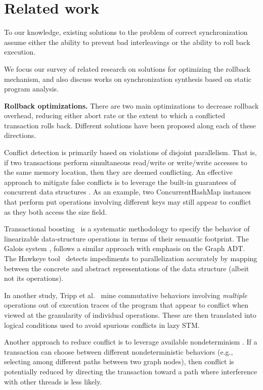 \section{Related work}
To our knowledge, existing solutions to the problem of correct synchronization assume either the ability to prevent bad interleavings or the ability to roll back execution. 

We focus our survey of related research on solutions for optimizing the rollback mechanism, and also discuss works on synchronization synthesis based on static program analysis.

\noindent \textbf{Rollback optimizations.}
There are two main optimizations to decrease rollback overhead, reducing either abort rate or the extent to which a conflicted transaction rolls back. Different solutions have been proposed along each of these directions.

Conflict detection is primarily based on violations of disjoint parallelism. That is, if two transactions perform simultaneous read/write or write/write accesses to the same memory location, then they are deemed conflicting. 
%
An effective approach to mitigate false conflicts is to leverage the built-in guarantees of concurrent data structures \cite{ppopp/HerlihyK08,Galois,TYFS:OOPSLA11}. As an example, two {\sf ConcurrentHashMap} instances that perform {\sf put} operations involving different keys may still appear to conflict as they both access the {\sf size} field.

Transactional boosting~\cite{ppopp/HerlihyK08} is a systematic methodology to specify the behavior of linearizable data-structure operations in terms of their semantic footprint. The Galois system \cite{Galois}, follows a similar approach with emphasis on the {\sf Graph} ADT. The Hawkeye tool~\cite{TYFS:OOPSLA11} detects impediments to parallelization accurately by mapping between the concrete and abstract representations of the data structure (albeit not its operations).

In another study, Tripp et al.~\cite{TMFS:PLDI12} mine commutative behaviors involving \emph{multiple} operations out of execution traces of the program that appear to conflict when viewed at the granularity of individual operations. These are then translated into logical conditions used to avoid spurious conflicts in lazy STM.

Another approach to reduce conflict is to leverage available nondeterminism \cite{TKS:OOPSLA13}. If a transaction can choose between different nondeterministic behaviors (e.g., selecting among different paths between two graph nodes), then conflict is potentially reduced by directing the transaction toward a path where interference with other threads is less likely.

